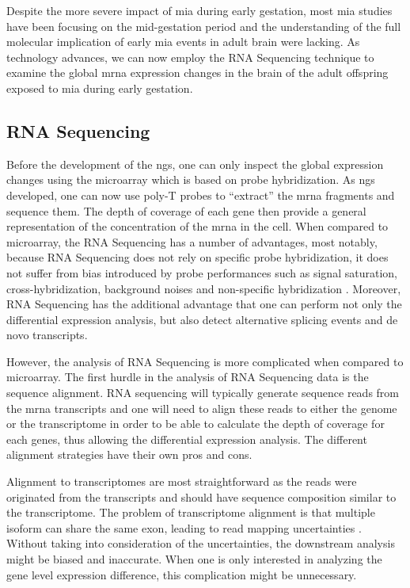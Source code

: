 \documentclass[12pt]{scrbook}
\begin{document}
	Despite the more severe impact of \gls{mia} during early gestation, most \gls{mia} studies have been focusing on the mid-gestation period and the understanding of the full molecular implication of early \gls{mia} events in adult brain were lacking.
	As technology advances, we can now employ the RNA Sequencing technique to examine the global \gls{mrna} expression changes in the brain of the adult offspring exposed to \gls{mia} during early gestation.
	
	\subsection{RNA Sequencing}
	Before the development of the \gls{ngs}, one can only inspect the global expression changes using the microarray which is based on probe hybridization.
	As \gls{ngs} developed, one can now use poly-T probes to ``extract'' the \gls{mrna} fragments and sequence them.
	The depth of coverage of each gene then provide a general representation of the concentration of the \gls{mrna} in the cell.
	When compared to microarray, the RNA Sequencing has a number of advantages, most notably, because RNA Sequencing does not rely on specific probe hybridization, it does not suffer from bias introduced by probe performances such as signal saturation, cross-hybridization, background noises and non-specific hybridization \citep{Zhao2014}.
	Moreover, RNA Sequencing has the additional advantage that one can perform not only the differential expression analysis, but also detect alternative splicing events and de novo transcripts.
	
	However, the analysis of RNA Sequencing is more complicated when compared to microarray.
	The first hurdle in the analysis of RNA Sequencing data is the sequence alignment.
	RNA sequencing will typically generate sequence reads from the \gls{mrna} transcripts and one will need to align these reads to either the genome or the transcriptome in order to be able to calculate the depth of coverage for each genes, thus allowing the differential expression analysis.
	The different alignment strategies have their own pros and cons.
	
	Alignment to transcriptomes are most straightforward as the reads were originated from the transcripts and should have sequence composition similar to the transcriptome. 
	The problem of transcriptome alignment is that multiple isoform can share the same exon, leading to read mapping uncertainties \citep{Li2011e}.
	Without taking into consideration of the uncertainties, the downstream analysis might be biased and inaccurate. 
	When one is only interested in analyzing the gene level expression difference, this complication might be unnecessary.
	
\end{document}
